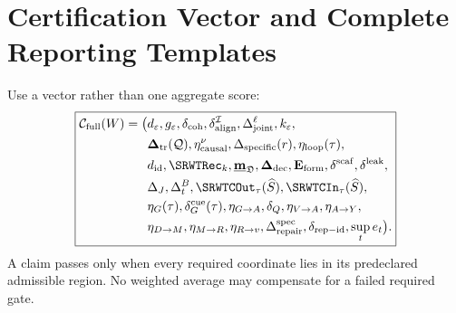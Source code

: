 \section{Certification Vector and Complete Reporting Templates}


Use a vector rather than one aggregate score:
\[
\boxed{
\begin{aligned}
\mathcal C_{\mathrm{full}}(W)
=\bigl(&
 d_\varepsilon,
 g_\varepsilon,
 \delta_{\mathrm{coh}},
 \delta_{\mathrm{align}}^{\mathcal I},
 \Delta_{\mathrm{joint}}^\ell,
 k_\varepsilon,\\
&\boldsymbol\Delta_{\mathrm{tr}}(\mathcal Q),
 \eta_{\mathrm{causal}}^\nu,
 \Delta_{\mathrm{specific}}(r),
 \eta_{\mathrm{loop}}(\tau),\\
&d_{\mathrm{id}},
 \SRWTRec_k,
 \underline{\mathbf m}_{\mathfrak D},
 \boldsymbol\Delta_{\mathrm{dec}},
 \mathbf E_{\mathrm{form}},
 \delta^{\mathrm{scaf}},
 \delta^{\mathrm{leak}},\\
&\Delta_J,
 \Delta_t^B,
 \SRWTCOut_\tau(\widehat S),
 \SRWTCIn_\tau(\widehat S),\\
&\eta_G(\tau),
 \delta_G^{\mathrm{cue}}(\tau),
 \eta_{G\to A},
 \delta_Q,
 \eta_{V\to A},
 \eta_{A\to Y},\\
&\eta_{D\to M},
 \eta_{M\to R},
 \eta_{R\to v},
 \Delta_{\mathrm{repair}}^{\mathrm{spec}},
 \delta_{\mathrm{rep-id}},
 \sup_t e_t
\bigr).
\end{aligned}
}
\]
A claim passes only when every required coordinate lies in its predeclared
admissible region. No weighted average may compensate for a failed required
gate.



